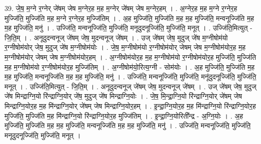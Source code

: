\documentclass[17pt]{extarticle}
\begin{document}
39. जे॒ष॒ म॒ग्ने र॒ग्नेर् जे॑षम् जेष म॒ग्नेर॒ह म॒ह म॒ग्नेर् जे॑षम् जेष म॒ग्नेर॒हम् । . अ॒ग्नेर॒ह म॒ह म॒ग्ने र॒ग्नेर॒ह मुज्जि॑ति॒ मुज्जि॑ति म॒ह म॒ग्ने र॒ग्नेर॒ह मुज्जि॑तिम् । . अ॒ह मुज्जि॑ति॒ मुज्जि॑ति म॒ह म॒ह मुज्जि॑ति॒ मन्वनूज्जि॑ति म॒ह म॒ह मुज्जि॑ति॒ मनु॑ । . उज्जि॑ति॒ मन्वनूज्जि॑ति॒ मुज्जि॑ति॒ मनूदुदनूज्जि॑ति॒ मुज्जि॑ति॒ मनूत् । . उज्जि॑ति॒मित्युत् - जि॒ति॒म् । . अनूदुदन्वनूज् जे॑षम् जेष॒ मुदन्वनूज् जे॑षम् । . उज् जे॑षम् जेष॒ मुदुज् जे॑ष म॒ग्नीषोम॑यो र॒ग्नीषोम॑योर् जेष॒ मुदुज् जे॑ष म॒ग्नीषोम॑योः । . जे॒ष॒ म॒ग्नीषोम॑यो र॒ग्नीषोम॑योर् जेषम् जेष म॒ग्नीषोम॑योर॒ह म॒ह म॒ग्नीषोम॑योर् जेषम् जेष म॒ग्नीषोम॑योर॒हम् । . अ॒ग्नीषोम॑योर॒ह म॒ह म॒ग्नीषोम॑यो र॒ग्नीषोम॑योर॒ह मुज्जि॑ति॒ मुज्जि॑ति म॒ह म॒ग्नीषोम॑यो र॒ग्नीषोम॑योर॒ह मुज्जि॑तिम् । . अ॒ग्नीषोम॑यो॒रित्य॒ग्नी - सोम॑योः । . अ॒ह मुज्जि॑ति॒ मुज्जि॑ति म॒ह म॒ह मुज्जि॑ति॒ मन्वनूज्जि॑ति म॒ह म॒ह मुज्जि॑ति॒ मनु॑ । . उज्जि॑ति॒ मन्वनूज्जि॑ति॒ मुज्जि॑ति॒ मनू॑दुदनूज्जि॑ति॒ मुज्जि॑ति॒ मनूत् । . उज्जि॑ति॒मित्युत् - जि॒ति॒म् । . अनूदुदन्वनूज् जे॑षम् जेष॒ मुदन्वनूज् जे॑षम् । . उज् जे॑षम् जेष॒ मुदुज् जे॑ष मिन्द्राग्नि॒यो रि॑न्द्राग्नि॒योर् जे॑ष॒ मुदुज् जे॑ष मिन्द्राग्नि॒योः । . जे॒ष॒ मि॒न्द्रा॒ग्नि॒यो रि॑न्द्राग्नि॒योर् जे॑षम् जेष मिन्द्राग्नि॒योर॒ह म॒ह मि॑न्द्राग्नि॒योर् जे॑षम् जेष मिन्द्राग्नि॒योर॒हम् । . इ॒न्द्रा॒ग्नि॒योर॒ह म॒ह मि॑न्द्राग्नि॒यो रि॑न्द्राग्नि॒योर॒ह मुज्जि॑ति॒ मुज्जि॑ति म॒ह मि॑न्द्राग्नि॒यो रि॑न्द्राग्नि॒योर॒ह मुज्जि॑तिम् । . इ॒न्द्रा॒ग्नि॒योरिती᳚न्द्र - अ॒ग्नि॒योः । . अ॒ह मुज्जि॑ति॒ मुज्जि॑ति म॒ह म॒ह मुज्जि॑ति॒ मन्वनूज्जि॑ति म॒ह म॒ह मुज्जि॑ति॒ मनु॑ । . उज्जि॑ति॒ मन्वनूज्जि॑ति॒ मुज्जि॑ति॒ मनूदुदनूज्जि॑ति॒ मुज्जि॑ति॒ मनूत् । \newline
\end{document}
